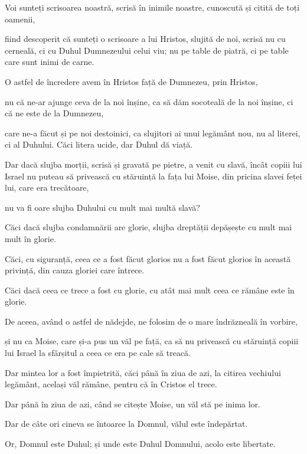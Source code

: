 {Voi sunteți scrisoarea noastră, scrisă în inimile noastre, cunoscută și citită de toți oamenii,

fiind descoperit că sunteți o scrisoare a lui Hristos, slujită de noi, scrisă nu cu cerneală, ci cu Duhul Dumnezeului celui viu; nu pe table de piatră, ci pe table care sunt inimi de carne.


\par }{\PP {}O astfel de încredere avem în Hristos față de Dumnezeu, prin Hristos,

nu că ne-ar ajunge ceva de la noi înșine, ca să dăm socoteală de la noi înșine, ci că ne este de la Dumnezeu,

care ne-a făcut și pe noi destoinici, ca slujitori ai unui legământ nou, nu al literei, ci al Duhului. Căci litera ucide, dar Duhul dă viață.


\par }{\PP {}Dar dacă slujba morții, scrisă și gravată pe pietre, a venit cu slavă, încât copiii lui Israel nu puteau să privească cu stăruință la fața lui Moise, din pricina slavei feței lui, care era trecătoare,

nu va fi oare slujba Duhului cu mult mai multă slavă?

Căci dacă slujba condamnării are glorie, slujba dreptății depășește cu mult mai mult în glorie.

Căci, cu siguranță, ceea ce a fost făcut glorios nu a fost făcut glorios în această privință, din cauza gloriei care întrece.

Căci dacă ceea ce trece a fost cu glorie, cu atât mai mult ceea ce rămâne este în glorie.


\par }{\PP {}De aceea, având o astfel de nădejde, ne folosim de o mare îndrăzneală în vorbire,

și nu ca Moise, care și-a pus un văl pe față, ca să nu privească cu stăruință copiii lui Israel la sfârșitul a ceea ce era pe cale să treacă.

Dar mintea lor a fost împietrită, căci până în ziua de azi, la citirea vechiului legământ, același văl rămâne, pentru că în Cristos el trece.

Dar până în ziua de azi, când se citește Moise, un văl stă pe inima lor.

Dar de câte ori cineva se întoarce la Domnul, vălul este îndepărtat.

Or, Domnul este Duhul; și unde este Duhul Domnului, acolo este libertate.

}
